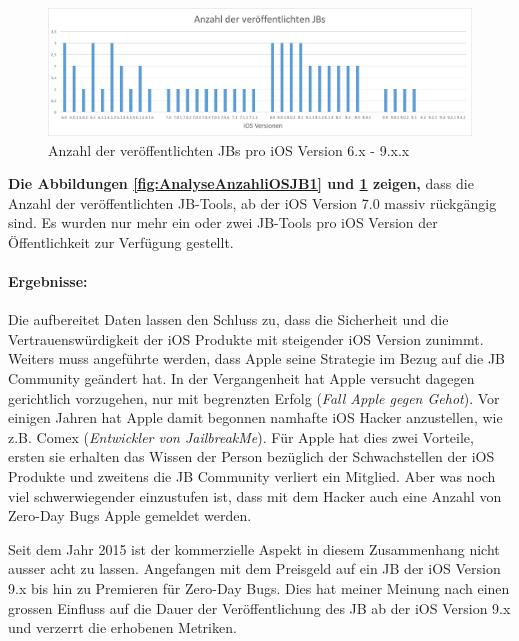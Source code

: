 \begin{figure}[htbp]
        \centering
                \includegraphics[scale=0.5]{Bilder/iOSJB2.png}
        \caption{Anzahl der veröffentlichten JBs pro iOS Version 6.x - 9.x.x}
        \label{fig:AnalyseAnzahliOSJB2}
\end{figure}

\textbf{Die Abbildungen \ref{fig:AnalyseAnzahliOSJB1} und \ref{fig:AnalyseAnzahliOSJB2} zeigen,} dass die Anzahl der veröffentlichten JB-Tools, ab der iOS Version 7.0 massiv rückgängig sind. Es wurden nur mehr ein oder zwei JB-Tools pro iOS Version der Öffentlichkeit zur Verfügung gestellt. 
\paragraph{Ergebnisse:} Die aufbereitet Daten lassen den Schluss zu, dass die Sicherheit und die Vertrauenswürdigkeit der iOS Produkte mit steigender iOS Version zunimmt. Weiters muss angeführte werden, dass Apple seine Strategie im Bezug auf die JB Community geändert hat. In der Vergangenheit hat Apple versucht dagegen gerichtlich vorzugehen, nur mit begrenzten Erfolg (\textit{\glqq Fall Apple gegen Gehot\grqq{}}). Vor einigen Jahren hat Apple damit begonnen namhafte iOS Hacker anzustellen,  wie z.B. Comex (\textit{\glqq Entwickler von JailbreakMe\grqq}). Für Apple hat dies zwei Vorteile, ersten sie erhalten das Wissen der Person bezüglich der Schwachstellen der iOS Produkte und zweitens die JB Community verliert ein Mitglied. Aber was noch viel schwerwiegender einzustufen ist, dass mit dem Hacker auch eine Anzahl von Zero-Day Bugs Apple gemeldet werden.\par
Seit dem Jahr 2015 ist der kommerzielle Aspekt in diesem Zusammenhang nicht ausser acht zu lassen. Angefangen mit dem Preisgeld auf ein JB der iOS Version 9.x bis hin zu Premieren für Zero-Day Bugs. Dies hat meiner Meinung nach einen grossen Einfluss auf die Dauer der Veröffentlichung des JB ab der iOS Version 9.x und verzerrt die erhobenen Metriken.

